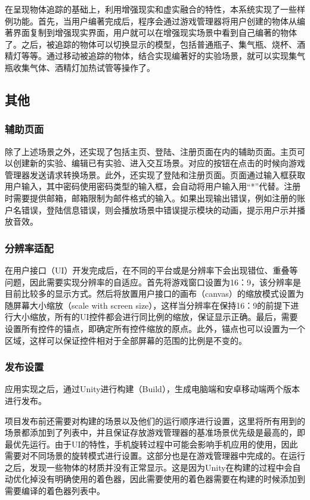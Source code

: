 在呈现物体追踪的基础上，利用增强现实和虚实融合的特性，本系统实现了一些样例功能。首先，当用户编著完成后，程序会通过游戏管理器将用户创建的物体从编著界面复制到增强现实界面，用户就可以在增强现实场景中看到自己编著的物体了。之后，被追踪的物体可以切换显示的模型，包括普通瓶子、集气瓶、烧杯、酒精灯等等。通过移动被追踪的物体，结合实现编著好的实验场景，就可以实现集气瓶收集气体、酒精灯加热试管等操作了。

\subsection{其他}
\subsubsection{辅助页面}
    除了上述场景之外，还实现了包括主页、登陆、注册页面在内的辅助页面。主页可以创建新的实验、编辑已有实验、进入交互场景。对应的按钮在点击的时候向游戏管理器发送请求转换场景。此外，还实现了登陆和注册页面。页面通过输入框获取用户输入，其中密码使用密码类型的输入框，会自动将用户输入用“*”代替。注册时需要提供邮箱，邮箱限制为邮件格式的输入。如果出现输出错误，例如注册的账户名错误，登陆信息错误，则会播放场景中错误提示模块的动画，提示用户示并播放音效。
    
    
\subsubsection{分辨率适配}

    在用户接口（UI）开发完成后，在不同的平台或是分辨率下会出现错位、重叠等问题，因此需要实现分辨率的自适应。首先将游戏窗口设置为16：9，该分辨率是目前比较多的显示方式。然后将放置用户接口的画布（canvas）的缩放模式设置为随屏幕大小缩放（scale with screen size），这样当分辨率在保持16：9的前提下进行大小缩放，所有的UI控件都会进行同比例的缩放，保证显示正确。最后，需要设置所有控件的锚点，即确定所有控件缩放的原点。此外，锚点也可以设置为一个区域，这样可以保证控件相对于全部屏幕的范围的比例是不变的。
    
\subsubsection{发布设置}

        应用实现之后，通过Unity进行构建（Build），生成电脑端和安卓移动端两个版本进行发布。
        
        项目发布前还需要对构建的场景以及他们的运行顺序进行设置，这里将所有用到的场景都添加到了列表中，并且保证存放游戏管理器的基准场景优先级是最高的，即最优先运行。由于UI的特性，手机旋转过程中可能会影响手机应用的使用，因此需要对不同场景的旋转模式进行设置。这部分也是在游戏管理器中完成的。在运行之后，发现一些物体的材质并没有正常显示。这是因为Unity在构建的过程中会自动优化掉没有明确使用的着色器，因此需要使用的着色器需要在构建的时候添加到需要编译的着色器列表中。
    
